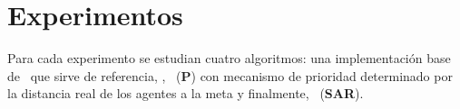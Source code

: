 \section{Experimentos}
\label{sec:experiments}

Para cada experimento se estudian cuatro algoritmos:
una implementaci\'on base de \astar\ que sirve de referencia,
\ambush, \pambush\ (\textbf{P}) con mecanismo de prioridad determinado por
la distancia real de los agentes a la meta y finalmente, \sarambush\
(\textbf{SAR}).

